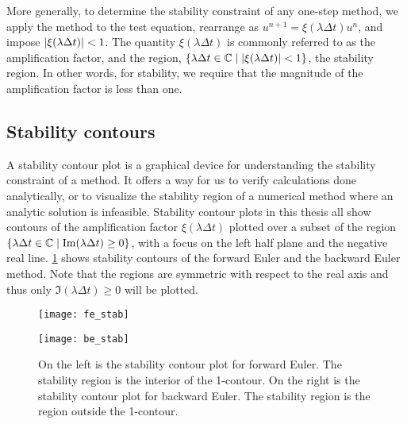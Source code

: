 More generally, to determine the stability constraint of any one-step method, we apply the method to the test equation, rearrange as $u^{n+1} = \xi(\lambda\Delta t) u^n$, and impose $\left|\xi(\lambda\Delta t)\right| < 1$. The quantity $\xi(\lambda\Delta t)$ is commonly referred to as the amplification factor, and the region, $\{\lambda\Delta t \in \mathbb{C} \mid \left|\xi(\lambda\Delta t)\right| < 1\}$, the stability region. In other words, for stability, we require that the magnitude of the amplification factor is less than one.
 
\subsection{Stability contours}
A stability contour plot is a graphical device for understanding the stability constraint of a method. It offers a way for us to verify calculations done analytically, or to visualize the stability region of a numerical method where an analytic solution is infeasible. Stability contour plots in this thesis all show contours of the amplification factor $\xi(\lambda\Delta t)$ plotted over a subset of the region $\{\lambda\Delta t \in \mathbb{C} \mid \operatorname{Im}(\lambda\Delta t) \geq 0\}$, with a focus on the left half plane and the negative real line. \cref{fig:FE BE stab cont} shows stability contours of the forward Euler and the backward Euler method. Note that the regions are symmetric with respect to the real axis and thus only $\Im(\lambda\Delta t) \geq 0$ will be plotted.

\begin{figure}[htb!]
	\centering
\begin{minipage}{0.45\textwidth}
\texttt{[image: fe\_stab]}
\end{minipage}
\begin{minipage}{0.45\textwidth}
\texttt{[image: be\_stab]}
\end{minipage}
\caption[Examples of stability contour plots.]{On the left is the stability contour plot for forward Euler. The stability region is the interior of the 1-contour. On the right is the stability contour plot for backward Euler. The stability region is the region outside the 1-contour.}
\label{fig:FE BE stab cont}
\end{figure}

